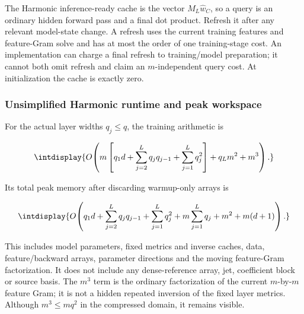 
The Harmonic inference-ready cache is the vector \(M_L\widehat w_C\), so a query is an ordinary hidden forward pass and a final dot product. Refresh it after any relevant model-state change. A refresh uses the current training features and feature-Gram solve and has at most the order of one training-stage cost. An implementation can charge a final refresh to training/model preparation; it cannot both omit refresh and claim an \(m\)-independent query cost. At initialization the cache is exactly zero.


\subsubsection{Unsimplified Harmonic runtime and peak workspace}



For the actual layer widths \(q_j\le q\), the training arithmetic is


\begingroup\renewcommand{\theHequation}{intdisplay.218}
\begin{equation}
\intdisplay{
O\!\left(
m\left[q_1d+\sum_{j=2}^Lq_jq_{j-1}+\sum_{j=1}^Lq_j^2\right]
 +q_Lm^2+m^3\right).
}
\label{int:eq-0099-cost-harmonic-training}
\end{equation}
\endgroup


Its total peak memory after discarding warmup-only arrays is


\begingroup\renewcommand{\theHequation}{intdisplay.219}
\begin{equation}
\intdisplay{
O\!\left(
q_1d+\sum_{j=2}^Lq_jq_{j-1}+\sum_{j=1}^Lq_j^2
 +m\sum_{j=1}^Lq_j+m^2+m(d+1)\right).
}
\label{int:eq-0100-cost-harmonic-training-memory}
\end{equation}
\endgroup


This includes model parameters, fixed metrics and inverse caches, data, feature/backward arrays, parameter directions and the moving feature-Gram factorization. It does not include any dense-reference array, jet, coefficient block or source basis. The \(m^3\) term is the ordinary factorization of the current \(m\)-by-\(m\) feature Gram; it is not a hidden repeated inversion of the fixed layer metrics. Although \(m^3\le mq^2\) in the compressed domain, it remains visible.


